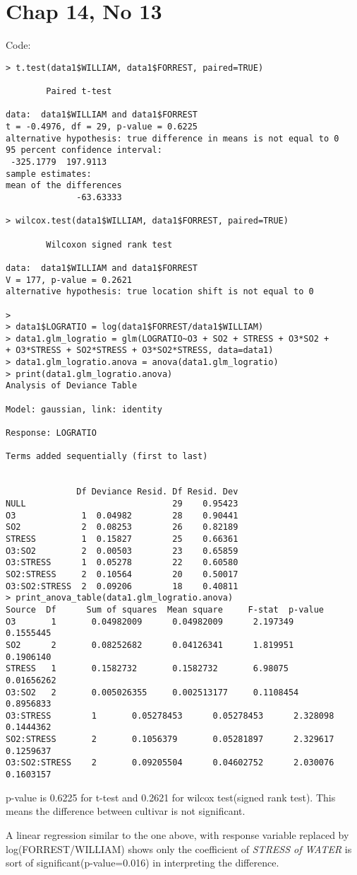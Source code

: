 \documentclass[a4paper,10pt]{article}
\begin{document}
\section{Chap 14, No 13}
Code:
\begin{verbatim}
> t.test(data1$WILLIAM, data1$FORREST, paired=TRUE)

        Paired t-test

data:  data1$WILLIAM and data1$FORREST
t = -0.4976, df = 29, p-value = 0.6225
alternative hypothesis: true difference in means is not equal to 0
95 percent confidence interval:
 -325.1779  197.9113
sample estimates:
mean of the differences
              -63.63333

> wilcox.test(data1$WILLIAM, data1$FORREST, paired=TRUE)

        Wilcoxon signed rank test

data:  data1$WILLIAM and data1$FORREST
V = 177, p-value = 0.2621
alternative hypothesis: true location shift is not equal to 0

>
> data1$LOGRATIO = log(data1$FORREST/data1$WILLIAM)
> data1.glm_logratio = glm(LOGRATIO~O3 + SO2 + STRESS + O3*SO2 +
+ O3*STRESS + SO2*STRESS + O3*SO2*STRESS, data=data1)
> data1.glm_logratio.anova = anova(data1.glm_logratio)
> print(data1.glm_logratio.anova)
Analysis of Deviance Table

Model: gaussian, link: identity

Response: LOGRATIO

Terms added sequentially (first to last)


              Df Deviance Resid. Df Resid. Dev
NULL                             29    0.95423
O3             1  0.04982        28    0.90441
SO2            2  0.08253        26    0.82189
STRESS         1  0.15827        25    0.66361
O3:SO2         2  0.00503        23    0.65859
O3:STRESS      1  0.05278        22    0.60580
SO2:STRESS     2  0.10564        20    0.50017
O3:SO2:STRESS  2  0.09206        18    0.40811
> print_anova_table(data1.glm_logratio.anova)
Source  Df      Sum of squares  Mean square     F-stat  p-value
O3       1       0.04982009      0.04982009      2.197349        0.1555445
SO2      2       0.08252682      0.04126341      1.819951        0.1906140
STRESS   1       0.1582732       0.1582732       6.98075         0.01656262
O3:SO2   2       0.005026355     0.002513177     0.1108454       0.8956833
O3:STRESS        1       0.05278453      0.05278453      2.328098        0.1444362
SO2:STRESS       2       0.1056379       0.05281897      2.329617        0.1259637
O3:SO2:STRESS    2       0.09205504      0.04602752      2.030076        0.1603157
\end{verbatim}

p-value is 0.6225 for t-test and 0.2621 for wilcox test(signed rank test). This means the difference between cultivar is not significant.

A linear regression similar to the one above, with response variable replaced by log(FORREST/WILLIAM) shows only the coefficient of \emph{STRESS of WATER} is sort of significant(p-value=0.016) in interpreting the difference.
\end{document}
